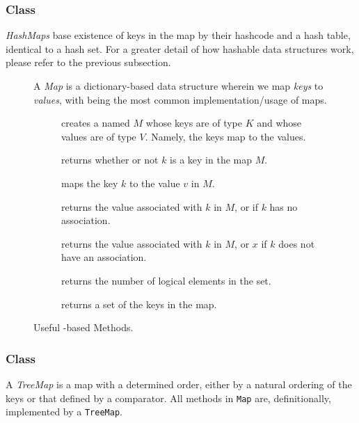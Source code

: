 \subsubsection*{ Class}
\emph{HashMaps} base existence of keys in the map by their hashcode and a hash table, identical to a hash set. 
For a greater detail of how hashable data structures work, please refer to the previous subsection.

\begin{figure}[tp]
  \small
  \begin{tcolorbox}[title=Java Maps]
    A \emph{Map} is a dictionary-based data structure wherein we map \emph{keys} to \emph{values}, with  being the most common implementation/usage of maps.
    \vspace{2ex}
  \begin{description}
    \item [] creates a  named $M$ whose keys are of type $K$ and whose values are of type $V$. Namely, the keys map to the values.
     \item [] returns whether or not $k$ is a key in the map $M$.
     \item [] maps the key $k$ to the value $v$ in $M$.
     \item [] returns the value associated with $k$ in $M$, or  if $k$ has no association.
     \item [] returns the value associated with $k$ in $M$, or $x$ if $k$ does not have an association.
    \item [] returns the number of logical elements in the set.
    \item [] returns a set of the keys in the map.
  \end{description}
\end{tcolorbox}
  \caption{Useful -based Methods.}
  \label{fig:hashmap}
\end{figure}

\subsubsection*{ Class}
A \emph{TreeMap} is a map with a determined order, either by a natural ordering of the keys or that defined by a comparator. 
All methods in \texttt{Map} are, definitionally, implemented by a \texttt{TreeMap}.


